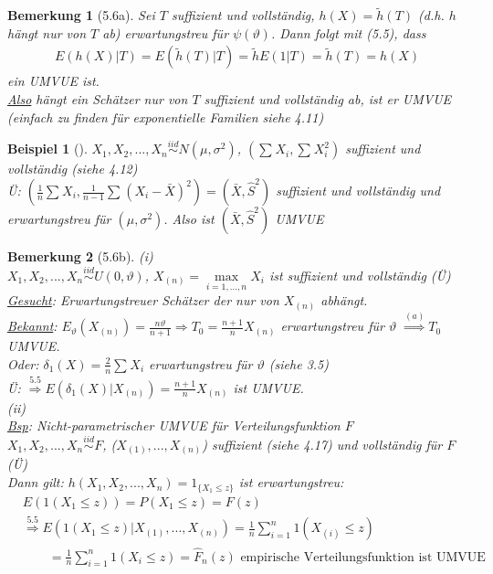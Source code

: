 \documentclass[a4paper,openany]{book}
\theoremstyle{mytheoremstyle}
\newtheorem*{bei}{Beispiel}
\newtheorem*{bem}{Bemerkung}
\theoremstyle{mytheoremstyle2}
\begin{document}
\begin{bem}[5.6a]
  Sei $T$ suffizient und vollständig, $h(X)=\tilde{h}(T)$ (d.h. $h$ hängt nur von $T$ ab) erwartungstreu für $\psi (\vartheta )$. Dann folgt mit (5.5), dass 
  \begin{align*}
    E (h(X)|T)=E(\tilde{h}(T)|T)=\tilde{h}E(1|T)=\tilde{h}(T)=h(X)
  \end{align*}
  ein UMVUE ist. \\
  \underline{Also} hängt ein Schätzer nur von $T$ suffizient und vollständig ab, ist er UMVUE (einfach zu finden für exponentielle Familien siehe 4.11)
\end{bem}
\begin{bei}[]
  $X_1,X_2,...,X_n \overset{iid}\sim N(\mu ,\sigma ^2)$, $(\sum_{}^{}{X_i},\sum_{}^{}{X_i^2})$ suffizient und vollständig  (siehe 4.12) \\
  Ü: $\left(\frac{1}{n}\sum_{}^{}{X_i},\frac{1}{n-1}\sum_{}^{}{(X_i-\bar{X})^2}\right)=(\bar{X},\hat{S}^2)$ suffizient und vollständig und erwartungstreu für $(\mu ,\sigma ^2)$. Also ist $(\bar{X},\hat{S}^2)$ UMVUE 
\end{bei}
\begin{bem}[5.6b]
  (i)\\
  $X_1,X_2,...,X_n \overset{iid}\sim U(0,\vartheta )$, $X _{(n)}=\max\limits _{i=1,...,n}X_i$ ist suffizient und vollständig (Ü) \\
  \underline{Gesucht}: Erwartungstreuer Schätzer der nur von $X _{(n)}$ abhängt. \\
  \underline{Bekannt}: $E _{\vartheta }(X _{(n)})=\frac{n \vartheta }{n+1}\Rightarrow T_0=\frac{n+1}{n}X _{(n)}$ erwartungstreu für $\vartheta $ $\overset{(a)}\Rightarrow T_0$ UMVUE.    \\
  Oder: $\delta _1(X)=\frac{2}{n}\sum_{}^{}{X_i}$ erwartungstreu für $\vartheta $ (siehe 3.5) \\
  Ü: $\overset{5.5}\Rightarrow E(\delta _1(X)|X _{(n)})=\frac{n+1}{n}X _{(n)}$ ist UMVUE. \\
  (ii) \\
  \underline{Bsp}: Nicht-parametrischer UMVUE für Verteilungsfunktion $F$ \\
  $X_1,X_2,...,X_n \overset{iid}\sim F$, ($X _{(1)},...,X _{(n)}$) suffizient (siehe 4.17) und vollständig für $F$ (Ü)  \\
  Dann gilt: $h(X_1,X_2,...,X_n )=1_{\{X_1 \leq z\}}$ ist erwartungstreu:
  \begin{align*}
    &E(1(X_1 \leq z))=P(X_1 \leq z)=F(z) \\
    &\overset{5.5}\Rightarrow E(1(X_1 \leq z)|X _{(1)},...,X _{(n)})=\frac{1}{n}\sum_{i=1}^{n}{1(X _{(i)}\leq z)} \\
    &\qquad=\frac{1}{n}\sum_{i=1}^{n}{1(X_i \leq z)}=\hat{F}_n(z) \text{ empirische Verteilungsfunktion ist UMVUE}
  \end{align*}
\end{bem}
\end{document}
